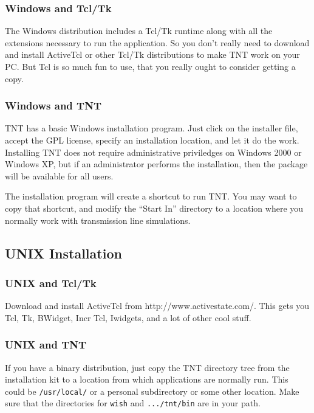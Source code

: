 \documentclass{article}
\begin{document}
\subsubsection {Windows and Tcl/Tk}

The Windows distribution includes a Tcl/Tk runtime along with
all the extensions necessary to run the application.  So you don't
really need to download and install ActiveTcl or other Tcl/Tk
distributions to make TNT work on your PC.  But Tcl is so much 
fun to use, that you really ought to consider getting a copy.


\subsubsection {Windows and TNT} \label{sec:win-install}

TNT has a basic Windows installation program.  Just click on the
installer file, accept the GPL license, specify an installation
location, and let it do the work.  Installing TNT does not require
administrative priviledges on Windows 2000 or Windows XP, but if an
administrator performs the installation, then the package will be
available for all users.

The installation program will create a shortcut to run TNT.  You may
want to copy that shortcut, and modify the ``Start In'' directory to a
location where you normally work with transmission line simulations.

\subsection {UNIX Installation}

\subsubsection {UNIX and Tcl/Tk}

Download and install ActiveTcl from http://www.activestate.com/.  This
gets you Tcl, Tk, BWidget, Incr Tcl, Iwidgets, and a lot of other cool
stuff.


\subsubsection {UNIX and TNT}

If you have a binary distribution, just copy the TNT directory tree
from the installation kit to a location from which applications are
normally run.  This could be {\tt /usr/local/} or a personal
subdirectory or some other location.  Make sure that the directories
for {\tt wish} and {\tt .../tnt/bin} are in your path.
\end{document}
